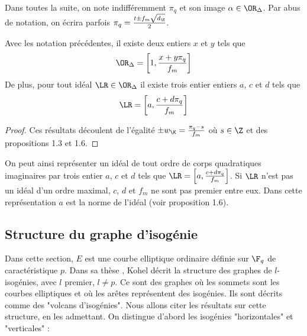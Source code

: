 \begin{Def}
	Dans toutes la suite, on note indifféremment $\pi_{q}$ et son image $\alpha\in\OR_{\Delta}$. Par abus de notation, on écrira parfois $\pi_{q} = \frac{t \pm f_{m}\sqrt{d_{\K}}}{2}$.
\end{Def}

\begin{Prop}
	
	Avec les notation précédentes, il existe deux entiers $x$ et $y$ tels que
	\begin{equation*}
		\OR_{\Delta} = \left[ 1, \frac{x + y\pi_{q}}{f_{m}}\right] 
	\end{equation*}
	De plus, pour tout idéal $\LR\in\OR_{\Delta}$ il existe trois entier entiers $a$, $c$ et $d$ tels que 
	\begin{equation*}
		\LR = \left[ a, \frac{c + d\pi_{q}}{f_{m}}\right] 
	\end{equation*}
	
\end{Prop}

\begin{proof}
	Ces résultats découlent de l'égalité $\pm w_{\K} = \frac{\pi_{q} - s}{f_{m}}$ où $s\in\Z$ et des propositions 1.3 et 1.6.
\end{proof}

\begin{Rem}
	On peut ainsi représenter un idéal de tout ordre de corps quadratiques imaginaires par trois entier $a$, $c$ et $d$ tels que $\LR = \left[ a, \frac{c + d\pi_{q}}{f_{m}}\right] $. Si $\LR$ n'est pas un idéal d'un ordre maximal, $c$, $d$ et $f_{m}$ ne sont pas premier entre eux. Dans cette représentation $a$ est la norme de l'idéal (voir proposition 1.6). 
\end{Rem}









\subsection{Structure du graphe d'isogénie}

Dans cette section, $E$ est une courbe elliptique ordinaire définie sur $\F_{q}$ de caractéristique $p$. Dans sa thèse \cite{Kohel}, Kohel décrit la structure des graphes de $l$-isogénies, avec $l$ premier, $l\neq p$. Ce sont des graphes où les sommets sont les courbes elliptiques et où les arêtes représentent des isogénies. Ils sont décrits comme des "volcans d'isogénies". Nous allons citer les résultats sur cette structure, en les admettant. On distingue d'abord les isogénies "horizontales" et "verticales" :


